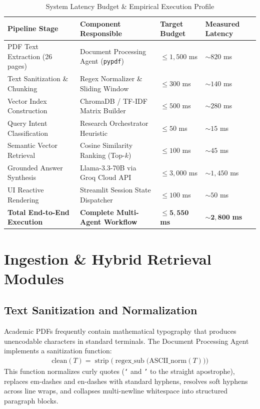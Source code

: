 \documentclass[conference]{IEEEtran}
\begin{document}
\begin{table}[!t]
\caption{System Latency Budget \& Empirical Execution Profile}
\label{tab:latency_budget}
\centering
\small
\setlength{\tabcolsep}{4pt}
\renewcommand{\arraystretch}{1.15}
\begin{tabularx}{\textwidth}{@{}Y Y l l@{}}
\toprule
\textbf{Pipeline Stage} & \textbf{Component Responsible} & \textbf{Target Budget} & \textbf{Measured Latency} \\
\midrule
PDF Text Extraction (26 pages) & Document Processing Agent (\texttt{pypdf}) & $\le 1{,}500$ ms & $\sim 820$ ms \\
Text Sanitization \& Chunking & Regex Normalizer \& Sliding Window & $\le 300$ ms & $\sim 140$ ms \\
Vector Index Construction & ChromaDB / TF-IDF Matrix Builder & $\le 500$ ms & $\sim 280$ ms \\
Query Intent Classification & Research Orchestrator Heuristic & $\le 50$ ms & $\sim 15$ ms \\
Semantic Vector Retrieval & Cosine Similarity Ranking (Top-$k$) & $\le 100$ ms & $\sim 45$ ms \\
Grounded Answer Synthesis & Llama-3.3-70B via Groq Cloud API & $\le 3{,}000$ ms & $\sim 1{,}450$ ms \\
UI Reactive Rendering & Streamlit Session State Dispatcher & $\le 100$ ms & $\sim 50$ ms \\
\midrule
\textbf{Total End-to-End Execution} & \textbf{Complete Multi-Agent Workflow} & $\mathbf{\le 5{,}550}$ \textbf{ms} & $\mathbf{\sim 2{,}800}$ \textbf{ms} \\
\bottomrule
\end{tabularx}
\end{table}

\section{Ingestion \& Hybrid Retrieval Modules}

\subsection{Text Sanitization and Normalization}
Academic PDFs frequently contain mathematical typography that produces unencodable characters in standard terminals. The Document Processing Agent implements a sanitization function:
\begin{equation}
\begin{split}
\text{clean}(T) = \operatorname{strip}\Big(
  \operatorname{regex\_sub}\big(\text{ASCII\_norm}(T)\big)\Big)
\end{split}
\end{equation}
This function normalizes curly quotes (\texttt{`} and \texttt{'} to the straight apostrophe), replaces em-dashes and en-dashes with standard hyphens, resolves soft hyphens across line wraps, and collapses multi-newline whitespace into structured paragraph blocks.
\end{document}

